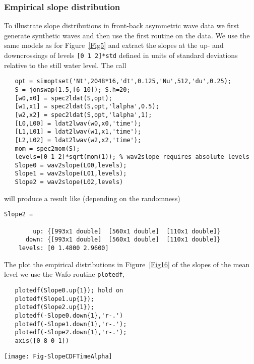 \subsubsection*{Empirical slope distribution}

To illustrate slope distributions in front-back asymmetric wave data we first generate synthetic waves and then
use the first routine on the data. We use the same models as for Figure~\ref{Fig5} and  extract the slopes at the up- and downcrossings of levels {\tt [0 1 2]*std} defined in units of standard deviations relative to the still water level. The call
{\small\begin{verbatim}
   opt = simoptset('Nt',2048*16,'dt',0.125,'Nu',512,'du',0.25);
   S = jonswap(1.5,[6 10]); S.h=20;
   [w0,x0] = spec2ldat(S,opt);
   [w1,x1] = spec2ldat(S,opt,'lalpha',0.5);
   [w2,x2] = spec2ldat(S,opt,'lalpha',1);
   [L0,L00] = ldat2lwav(w0,x0,'time');
   [L1,L01] = ldat2lwav(w1,x1,'time');
   [L2,L02] = ldat2lwav(w2,x2,'time');
   mom = spec2mom(S);
   levels=[0 1 2]*sqrt(mom(1)); % wav2slope requires absolute levels
   Slope0 = wav2slope(L00,levels);
   Slope1 = wav2slope(L01,levels);
   Slope2 = wav2slope(L02,levels)
\end{verbatim}
}
\noindent
will produce a result like (depending on the randomness)
{\small\begin{verbatim}
Slope2 =

        up: {[993x1 double]  [560x1 double]  [110x1 double]}
      down: {[993x1 double]  [560x1 double]  [110x1 double]}
    levels: [0 1.4800 2.9600]
\end{verbatim}
}
The plot the empirical distributions in Figure~\ref{Fig16} of the slopes of the mean level we use the
{\sc Wafo} routine {\tt plotedf},
{\small\begin{verbatim}
   plotedf(Slope0.up{1}); hold on
   plotedf(Slope1.up{1});
   plotedf(Slope2.up{1});
   plotedf(-Slope0.down{1},'r-.')
   plotedf(-Slope1.down{1},'r-.');
   plotedf(-Slope2.down{1},'r-.');
   axis([0 8 0 1])
\end{verbatim}
}

\begin{SCfigure}[1]
\texttt{[image: Fig-SlopeCDFTimeAlpha]}
\caption{Empirical distributions of up- an downcrossing (absolute values) slopes at still water level for Lagrange time waves with different degrees of front-back asymmetry; $\alpha = 0, 0.5, 1$.}
\label{Fig16}
\end{SCfigure}

